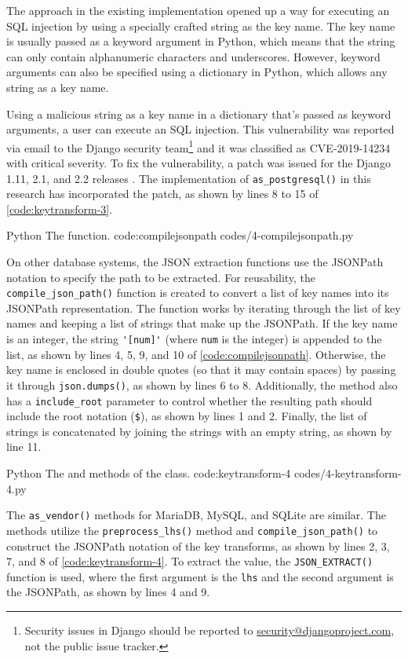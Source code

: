 The approach in the existing implementation opened up a way for executing an
SQL injection by using a specially crafted string as the key name. The key name
is usually passed as a keyword argument in Python, which means that the string
can only contain alphanumeric characters and underscores. However, keyword
arguments can also be specified using a dictionary in Python, which allows any
string as a key name.

Using a malicious string as a key name in a dictionary that's passed as keyword
arguments, a user can execute an SQL injection. This vulnerability was reported
via email to the Django security team\footnote{Security issues in Django should
be reported to
\href{mailto:security@djangoproject.com}{security@djangoproject.com}, not the
public issue tracker.} and it was classified as CVE-2019-14234 \cite{cve} with
critical severity. To fix the vulnerability, a patch was issued for the Django
1.11, 2.1, and 2.2 releases \cite{django:securityrelease}. The implementation
of \verb|as_postgresql()| in this research has incorporated the patch, as shown
by lines 8 to 15 of \autoref{code:keytransform-3}.

\listing
{Python}
{The  function.}
{code:compilejsonpath}
{codes/4-compilejsonpath.py}

On other database systems, the JSON extraction functions use the JSONPath
notation to specify the path to be extracted. For reusability, the
\verb|compile_json_path()| function is created to convert a list of key names
into its JSONPath representation. The function works by iterating through the
list of key names and keeping a list of strings that make up the JSONPath. If
the key name is an integer, the string \verb|'[num]'| (where \verb|num| is the
integer) is appended to the list, as shown by lines 4, 5, 9, and 10 of
\autoref{code:compilejsonpath}. Otherwise, the key name is enclosed in double
quotes (so that it may contain spaces) by passing it through
\verb|json.dumps()|, as shown by lines 6 to 8. Additionally, the method also
has a \verb|include_root| parameter to control whether the resulting path
should include the root notation (\verb|$|), as shown by lines 1 and 2.
Finally, the list of strings is concatenated by joining the strings with an
empty string, as shown by line 11.

\listing
{Python}
{The  and  methods of the  class.}
{code:keytransform-4}
{codes/4-keytransform-4.py}

The \verb|as_vendor()| methods for MariaDB, MySQL, and SQLite are similar. The
methods utilize the \verb|preprocess_lhs()| method and
\verb|compile_json_path()| to construct the JSONPath notation of the key
transforms, as shown by lines 2, 3, 7, and 8 of \autoref{code:keytransform-4}.
To extract the value, the \verb|JSON_EXTRACT()| function is used, where the
first argument is the \verb|lhs| and the second argument is the JSONPath, as
shown by lines 4 and 9.

